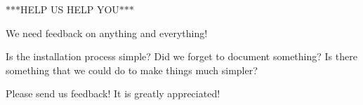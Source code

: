 $\ast$$\ast$$\ast$\-H\-E\-L\-P U\-S H\-E\-L\-P Y\-O\-U$\ast$$\ast$$\ast$

We need feedback on anything and everything!

Is the installation process simple? Did we forget to document something? Is there something that we could do to make things much simpler?

Please send us feedback! It is greatly appreciated! 